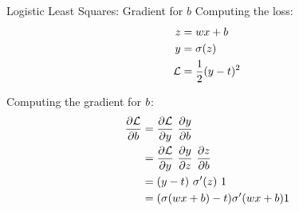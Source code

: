 \documentclass[handout,aspectratio=169]{beamer}
\begin{document}
\begin{frame}{Logistic Least Squares: Gradient for $b$}
  Computing the loss:
  \begin{align*}
    \Large
    z &= w x + b \\
    y &= \sigma(z) \\
    {\cal L} &= \frac{1}{2} (y - t)^2 
  \end{align*}
  
Computing the gradient for $b$:
\begin{align*}
    \frac{\partial {\cal L}}{\partial b} 
    &= \frac{\partial {\cal L}}{\partial y} \,\, \frac{\partial y}{\partial b}  \\
    &= \frac{\partial {\cal L}}{\partial y} \,\, \frac{\partial y}{\partial z} \,\, \frac{\partial z}{\partial b}  \\
            &= (y - t) \,\, \sigma^\prime (z) \,\, 1 \\
            &= (\sigma(w x + b) - t) \sigma^\prime (w x + b) 1
\end{align*}
\end{frame}
\end{document}
